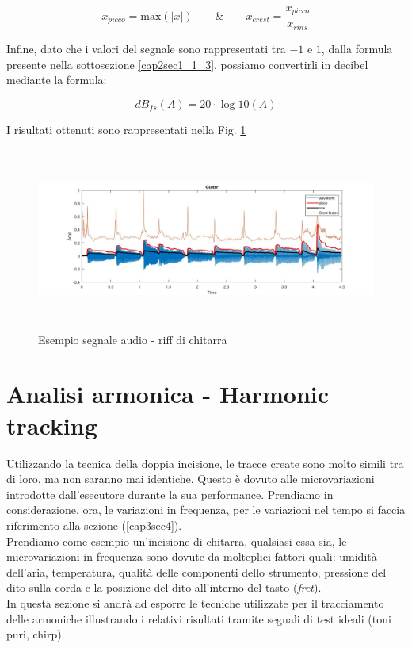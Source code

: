 \documentclass[12pt]{report}
\begin{document}
$$ x_{picco} = \mbox{max}(|x|) \qquad \mbox{\&} \qquad x_{crest} = \frac{x_{picco}}{x_{rms}}$$

Infine, dato che i valori del segnale sono rappresentati tra $-1$ e $1$, dalla formula presente nella sottosezione \ref{cap2sec1_1_3}, possiamo convertirli in decibel mediante la formula:

$$ dB_{fs}(A) = 20 \cdot \log{10}(A) $$

I risultati ottenuti sono rappresentati nella Fig. \ref{fig:wave_rms_picco}

\begin{figure}[htbp]
\centerline{\includegraphics[height=60mm]{img/wave_rms_piccoa}}
\caption{Esempio segnale audio - riff di chitarra}
\label{fig:wave_rms_picco}
\end{figure}

\clearpage

	\section{Analisi armonica - Harmonic tracking}
	\label{cap3sec2}
		Utilizzando la tecnica della doppia incisione, le tracce create sono molto simili tra di loro, ma non saranno mai identiche. Questo è dovuto alle microvariazioni introdotte dall'esecutore durante la sua performance. Prendiamo in considerazione, ora, le variazioni in frequenza, per le variazioni nel tempo si faccia riferimento alla sezione (\ref{cap3sec4}).\\
Prendiamo come esempio un'incisione di chitarra, qualsiasi essa sia, le microvariazioni in frequenza sono dovute da molteplici fattori quali: umidità dell'aria, temperatura, qualità delle componenti dello strumento, pressione del dito sulla corda e la posizione del dito all'interno del tasto ({\itshape fret}).\\
In questa sezione si andrà ad esporre le tecniche utilizzate per il tracciamento delle armoniche illustrando i relativi risultati tramite segnali di test ideali (toni puri, chirp).
\end{document}
